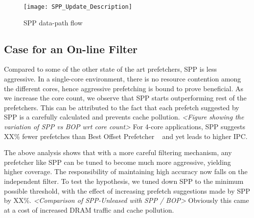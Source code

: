\begin{figure}
  \begin{center}
  \texttt{[image: SPP\_Update\_Description]}
  \label{fig:spp_update}
  \caption{SPP data-path flow}
  \end{center}
\end{figure}



\subsection{Case for an On-line Filter}
\label{Background-Case}

Compared to some of the other state of the art prefetchers, SPP is
less aggressive.  In a single-core environment, there is no resource
contention among the different cores, hence aggressive prefetching is bound to prove beneficial. 
As we increase the core
count, we observe that SPP starts outperforming rest of the prefetchers.  This
can be attributed to the fact that each prefetch suggested by SPP is a
carefully calculated and prevents cache pollution.  \textit{<Figure
showing the variation of SPP vs BOP wrt core count>} For 4-core applications,
SPP suggests XX\% fewer prefetches than Best Offset Prefetcher ~\cite{bop} and yet leads to higher IPC.

The above analysis shows that with a more careful filtering mechanism, any
prefetcher like SPP can be tuned to become much more aggressive, yielding higher coverage.  The responsibility of maintaining high accuracy now falls on the
independent filter.  To test the hypothesis, we tuned down SPP to the
minimum possible threshold, with the effect of increasing prefetch suggestions
made by SPP by XX\%.  \textit{<Comparison of SPP-Unleased with SPP / BOP>}
Obviously this came at a cost of increased DRAM traffic and cache pollution.

